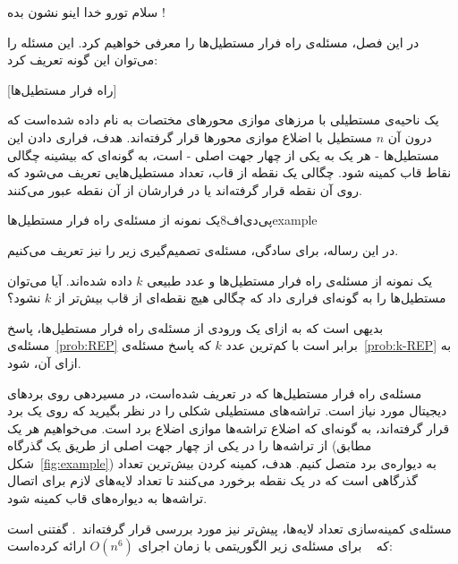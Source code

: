 


سلام تورو خدا اینو نشون بده !‌

در این فصل، مسئله‌ی راه فرار مستطیل‌ها را معرفی خواهیم کرد. این مسئله را می‌توان این گونه تعریف کرد:

[راه فرار مستطیل‌ها]
\label{prob:REP}

یک ناحیه‌ی مستطیلی با مرز‌های موازی محور‌های مختصات به نام  داده شده‌است که درون آن $n$ مستطیل با اضلاع موازی محور‌ها قرار گرفته‌اند. هدف، فراری دادن این مستطیل‌ها - هر یک به یکی از چهار جهت اصلی - است، به گونه‌ای که بیشینه چگالی نقاط قاب کمینه شود. چگالی یک نقطه از قاب، تعداد مستطیل‌هایی تعریف می‌شود که روی آن نقطه قرار گرفته‌اند یا در فرارشان از آن نقطه عبور می‌کنند.


‌پی‌دی‌اف{8}{یک نمونه از مسئله‌ی راه فرار مستطیل‌ها}{example}

در این رساله، برای سادگی، مسئله‌ی تصمیم‌گیری زیر را نیز تعریف می‌کنیم.

\label{prob:k-REP}

یک نمونه از مسئله‌ی راه فرار مستطیل‌ها و عدد طبیعی $k$ داده شده‌اند. آیا می‌توان مستطیل‌ها را به گونه‌ای فراری داد که چگالی هیچ نقطه‌ای از قاب بیش‌تر از $k$ نشود؟


بدیهی است که به ازای یک ورودی از مسئله‌ی راه فرار مستطیل‌ها، پاسخ مسئله‌ی~\ref{prob:REP} برابر است با کم‌ترین عدد $k$ که پاسخ مسئله‌ی~\ref{prob:k-REP} به ازای آن،  شود.

مسئله‌ی راه فرار مستطیل‌ها که در \cite{REP} تعریف شده‌است، در مسیر‌دهی روی برد‌های دیجیتال مورد نیاز است. تراشه‌های مستطیلی شکلی را در نظر بگیرید که روی یک برد قرار گرفته‌اند، به گونه‌ای که اضلاع تراشه‌ها موازی اضلاع برد است. می‌خواهیم هر یک از تراشه‌ها را در یکی از چهار جهت اصلی از طریق یک گذر‌گاه (مطابق شکل~\ref{fig:example}) به دیواره‌ی برد متصل کنیم. هدف، کمینه کردن بیش‌ترین تعداد گذرگاهی است که در یک نقطه برخورد می‌کنند تا تعداد لایه‌های لازم برای اتصال تراشه‌ها به دیواره‌های قاب کمینه شود.

مسئله‌ی کمینه‌سازی تعداد لایه‌ها، پیش‌تر نیز مورد بررسی قرار گرفته‌اند~\cite{BoundaryRec,KongBUSPLANNER,MaREP,MaOPT,motiveOZDAL,WuILP,Yan12,Yan2012,KongBIPARTITE}. گفتنی است که ~\cite{BoundaryRec} برای مسئله‌ی زیر الگوریتمی با زمان اجرای $O(n ^ 6)$ ارائه کرده‌است:

